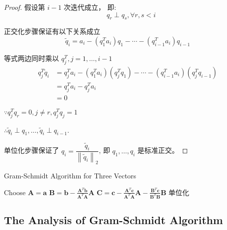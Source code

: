 \begin{proof}
    假设第 $ i-1 $ 次迭代成立，  即: \begin{equation} \quad q_{r} \perp q_{s}, \forall r, s<i \end{equation}

    正交化步骤保证有以下关系成立
    \begin{equation} \tilde{q}_{i}=a_{i}-\left(q_{1}^{T} a_{i}\right) q_{1}-\cdots-\left(q_{i-1}^{T} a_{i}\right) q_{i-1} \end{equation}

    等式两边同时乘以 $ q_{j}^{T}, j=1, \ldots, i-1 $
    \begin{equation} \begin{aligned} q_{j}^{T} \tilde{q}_{i} &=q_{j}^{T} a_{i}-\left(q_{1}^{T} a_{i}\right)\left(q_{j}^{T} q_{1}\right)-\cdots-\left(q_{i-1}^{T} a_{i}\right)\left(q_{j}^{T} q_{i-1}\right) \\ &=q_{j}^{T} a_{i}-q_{j}^{T} a_{i}
        \\ &=0  \end{aligned} \end{equation}

    $ \because q_{j}^{T} q_{r}=0, j \neq r, q_{j}^{T} q_{j}=1 $

     $\therefore \tilde{q}_{i} \perp q_{1}, \ldots, \tilde{q}_{i} \perp q_{i-1} $.

    单位化步骤保证了 $
    q_{i}=\dfrac{\tilde{q}_{i}}{\left\|\tilde{q}_{i}\right\|_{2}}$, 即 $ q_{1}, \ldots, q_{i} $ 是标准正交。 
\end{proof}

\begin{algorithm}[htbp]
    \caption{Gram-Schmidt Algorithm for Three Vectors}
    Choose $ \boldsymbol{A}=\boldsymbol{a} $\;
    $ \boldsymbol{B}=\boldsymbol{b}-\frac{\boldsymbol{A}^{{T}} \boldsymbol{b}}{\boldsymbol{A}^{{T}} \boldsymbol{A}} \boldsymbol{A} $\;
    $ \boldsymbol{C}=\boldsymbol{c}-\frac{\boldsymbol{A}^{{T}} \boldsymbol{c}}{\boldsymbol{A}^{{T}} \boldsymbol{A}} \boldsymbol{A}-\frac{\boldsymbol{B}^{{T}} \boldsymbol{c}}{\boldsymbol{B}^{{T}} \boldsymbol{B}} \boldsymbol{B}   $\;
    单位化\;
\end{algorithm}

\subsection{The Analysis of Gram-Schmidt Algorithm}

